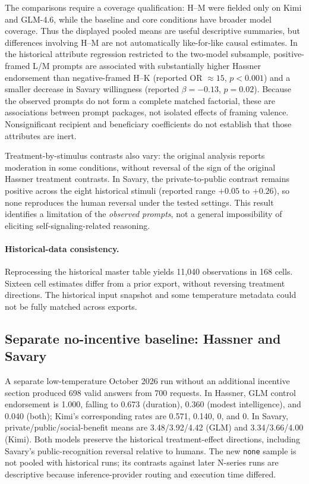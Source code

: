 \documentclass[14pt,a4paper]{extarticle}
\begin{document}
The comparisons require a coverage qualification: H--M were fielded only on Kimi and GLM-4.6, while the baseline and core conditions have broader model coverage. Thus the displayed pooled means are useful descriptive summaries, but differences involving H--M are not automatically like-for-like causal estimates. In the historical attribute regression restricted to the two-model subsample, positive-framed L/M prompts are associated with substantially higher Hassner endorsement than negative-framed H--K (reported OR $\approx15$, $p<0.001$) and a smaller decrease in Savary willingness (reported $\beta=-0.13$, $p=0.02$). Because the observed prompts do not form a complete matched factorial, these are associations between prompt packages, not isolated effects of framing valence. Nonsignificant recipient and beneficiary coefficients do not establish that those attributes are inert.

Treatment-by-stimulus contrasts also vary: the original analysis reports moderation in some conditions, without reversal of the sign of the original Hassner treatment contrasts. In Savary, the private-to-public contrast remains positive across the eight historical stimuli (reported range $+0.05$ to $+0.26$), so none reproduces the human reversal under the tested settings. This result identifies a limitation of the \emph{observed prompts}, not a general impossibility of eliciting self-signaling-related reasoning.

\paragraph{Historical-data consistency.}
Reprocessing the historical master table yields 11,040 observations in 168 cells. Sixteen cell estimates differ from a prior export, without reversing treatment directions. The historical input snapshot and some temperature metadata could not be fully matched across exports.

\subsection{Separate no-incentive baseline: Hassner and Savary}

A separate low-temperature October 2026 run without an additional incentive section produced 698 valid answers from 700 requests. In Hassner, GLM control endorsement is 1.000, falling to 0.673 (duration), 0.360 (modest intelligence), and 0.040 (both); Kimi's corresponding rates are 0.571, 0.140, 0, and 0. In Savary, private/public/social-benefit means are 3.48/3.92/4.42 (GLM) and 3.34/3.66/4.00 (Kimi). Both models preserve the historical treatment-effect directions, including Savary's public-recognition reversal relative to humans. The new \texttt{none} sample is not pooled with historical runs; its contrasts against later N-series runs are descriptive because inference-provider routing and execution time differed.
\end{document}
